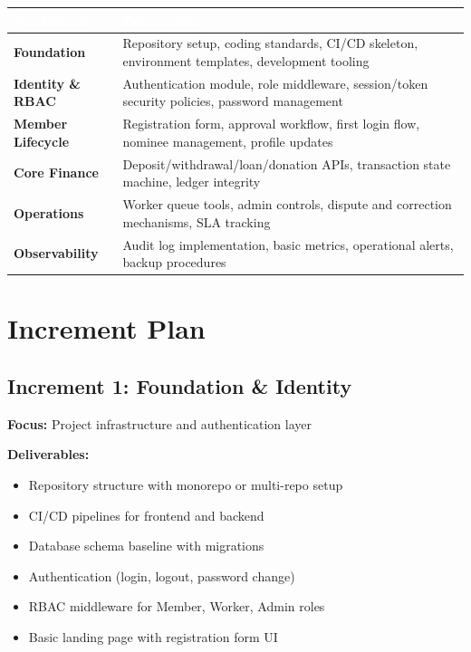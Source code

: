 \documentclass[11pt,a4paper]{article}
\begin{document}
\begin{longtable}{@{}>{\bfseries\columncolor{tableheader}}p{}p{}@{}}
\toprule
\rowcolor{primaryblue}
\textcolor{white}{\textbf{Workstream}} & \textcolor{white}{\textbf{Deliverables}} \\
\midrule
\endhead
Foundation & Repository setup, coding standards, CI/CD skeleton, environment templates, development tooling \\
\midrule
Identity \& RBAC & Authentication module, role middleware, session/token security policies, password management \\
\midrule
Member Lifecycle & Registration form, approval workflow, first login flow, nominee management, profile updates \\
\midrule
Core Finance & Deposit/withdrawal/loan/donation APIs, transaction state machine, ledger integrity \\
\midrule
Operations & Worker queue tools, admin controls, dispute and correction mechanisms, SLA tracking \\
\midrule
Observability & Audit log implementation, basic metrics, operational alerts, backup procedures \\
\bottomrule
\end{longtable}

\section{Increment Plan}

\subsection{Increment 1: Foundation \& Identity}

\textbf{Focus:} Project infrastructure and authentication layer

\textbf{Deliverables:}
\begin{itemize}
    \item Repository structure with monorepo or multi-repo setup
    \item CI/CD pipelines for frontend and backend
    \item Database schema baseline with migrations
    \item Authentication (login, logout, password change)
    \item RBAC middleware for Member, Worker, Admin roles
    \item Basic landing page with registration form UI
\end{itemize}
\end{document}
